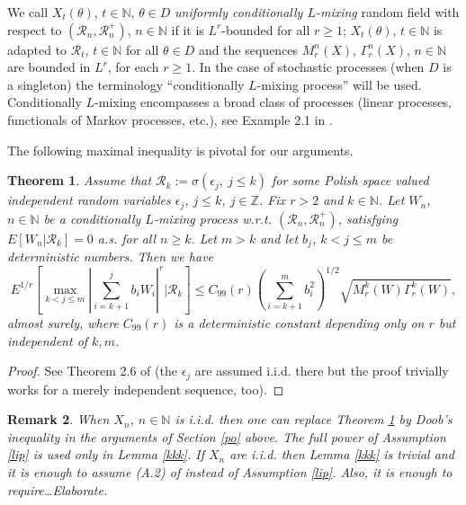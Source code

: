 \documentclass[a4paper,draft]{article}
\newtheorem{theorem}{Theorem}[section]
\newtheorem{remark}[theorem]{Remark}
\begin{document}
We call $X_t(\theta)$, $t\in\mathbb{N}$, $\theta\in D$
\emph{uniformly {conditionally} $L$-mixing} random field
with respect to $(\mathcal{R}_n,\mathcal{R}_n^+)$, $n\in\mathbb{N}$ if
it is $L^r$-bounded for all $r\geq 1$; $X_t(\theta)$, $t\in\mathbb{N}$ is adapted to
$\mathcal{R}_t$, $t\in\mathbb{N}$
for all $\theta\in D$
and the sequences  $M^n_r(X)$, $\Gamma^n_r(X)$, $n\in\mathbb{N}$
are bounded in $L^r$, for each $r\geq 1$. In the case of stochastic processes
(when $D$ is a singleton)
the terminology ``conditionally $L$-mixing process'' will be used. 
Conditionally $L$-mixing encompasses a broad class of processes (linear processes,
functionals of Markov processes, etc.), see Example 2.1 in \cite{convex}.

The following maximal inequality 
is pivotal for our arguments.

\begin{theorem}\label{estim} Assume that
$\mathcal{R}_k:=\sigma(\epsilon_j,\
j\leq k)$ for some Polish space valued independent random variables $\epsilon_j$, $j\leq k$, $j\in\mathbb{Z}$.
Fix $r>2$ and $k\in\mathbb{N}$.
Let $W_n$, $n\in\mathbb{N}$ be a conditionally $L$-mixing process
w.r.t. $(\mathcal{R}_n,\mathcal{R}_n^+)$, satisfying
$E[W_n\vert\mathcal{R}_k]=0$ a.s. for all {$n\geq k$}.
Let $m >k$ and let $b_j$, $k< j\leq m$ be deterministic numbers. Then we have
\begin{equation}\label{mandrill}
E^{1/r}\left[ \max_{k < j \le m} \left| \sum_{i = k+1}^{j} b_i W_i \right|^r \big\vert\mathcal{R}_k \right]
 \le C_{99}(r)\left( \sum_{i=k+1}^{m} b_i^2 \right)^{1/2} \sqrt{{M}_r^{k}(W) \Gamma_r^{k}(W)},
\end{equation}
almost surely, where $C_{99}(r)$ is a deterministic constant depending only on $r$ but independent of $k,m$.
\end{theorem}
\begin{proof} See Theorem 2.6 of \cite{4} (the $\epsilon_j$ are assumed i.i.d. there but the proof
trivially works for a merely independent sequence, too).
\end{proof}

\begin{remark}\label{padi2} {\rm When $X_n$, 
$n\in\mathbb{N}$ is i.i.d. then one can replace Theorem \ref{estim} by Doob's inequality in
the arguments of Section \ref{po} above. The full power of Assumption \ref{lip} is
used only in Lemma \ref{kkk}. If $X_n$ are i.i.d. then Lemma \ref{kkk} is trivial
and it is enough to assume (A.2) of \cite{raginsky} instead of Assumption \ref{lip}. Also, it is enough to require\ldots Elaborate.}
\end{remark}
\end{document}

